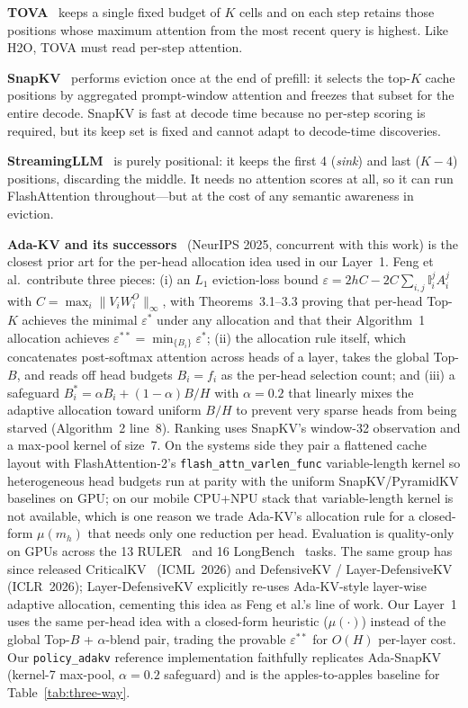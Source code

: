 \documentclass[sigconf, anonymous=false, screen=true]{acmart}
\begin{document}
\textbf{TOVA}~\cite{oren2024tova} keeps a single fixed budget of $K$ cells and on each step retains those positions whose maximum attention from the most recent query is highest. Like H2O, TOVA must read per-step attention.

\textbf{SnapKV}~\cite{li2024snapkv} performs eviction once at the end of prefill: it selects the top-$K$ cache positions by aggregated prompt-window attention and freezes that subset for the entire decode. SnapKV is fast at decode time because no per-step scoring is required, but its keep set is fixed and cannot adapt to decode-time discoveries.

\textbf{StreamingLLM}~\cite{xiao2024streamingllm} is purely positional: it keeps the first 4 (\emph{sink}) and last ($K-4$) positions, discarding the middle. It needs no attention scores at all, so it can run FlashAttention throughout---but at the cost of any semantic awareness in eviction.

\textbf{Ada-KV and its successors}~\cite{feng2025adakv} (NeurIPS 2025, concurrent with this work) is the closest prior art for the per-head allocation idea used in our Layer~1. Feng et al.\ contribute three pieces: (i) an $L_1$ eviction-loss bound $\varepsilon = 2hC - 2C\sum_{i,j}\mathbb{I}_i^j A_i^j$ with $C = \max_i \|V_i W_i^O\|_\infty$, with Theorems~3.1--3.3 proving that per-head Top-$K$ achieves the minimal $\varepsilon^\ast$ under any allocation and that their Algorithm~1 allocation achieves $\varepsilon^{\ast\ast} = \min_{\{B_i\}} \varepsilon^\ast$; (ii) the allocation rule itself, which concatenates post-softmax attention across heads of a layer, takes the global Top-$B$, and reads off head budgets $B_i = f_i$ as the per-head selection count; and (iii) a safeguard $B_i^\ast = \alpha B_i + (1-\alpha) B/H$ with $\alpha = 0.2$ that linearly mixes the adaptive allocation toward uniform $B/H$ to prevent very sparse heads from being starved (Algorithm~2 line~8). Ranking uses SnapKV's window-32 observation and a max-pool kernel of size~7. On the systems side they pair a flattened cache layout with FlashAttention-2's \texttt{flash\_attn\_varlen\_func} variable-length kernel so heterogeneous head budgets run at parity with the uniform SnapKV/PyramidKV baselines on GPU; on our mobile CPU+NPU stack that variable-length kernel is not available, which is one reason we trade Ada-KV's allocation rule for a closed-form $\mu(m_h)$ that needs only one reduction per head. Evaluation is quality-only on GPUs across the 13 RULER~\cite{hsieh2024ruler} and 16 LongBench~\cite{bai2023longbench} tasks. The same group has since released CriticalKV~\cite{feng2025criticalkv} (ICML~2026) and DefensiveKV / Layer-DefensiveKV~\cite{feng2025defensivekv} (ICLR~2026); Layer-DefensiveKV explicitly re-uses Ada-KV-style layer-wise adaptive allocation, cementing this idea as Feng et al.'s line of work. Our Layer~1 uses the same per-head idea with a closed-form heuristic ($\mu(\cdot)$) instead of the global Top-$B$ + $\alpha$-blend pair, trading the provable $\varepsilon^{\ast\ast}$ for $O(H)$ per-layer cost. Our \texttt{policy\_adakv} reference implementation faithfully replicates Ada-SnapKV (kernel-7 max-pool, $\alpha{=}0.2$ safeguard) and is the apples-to-apples baseline for Table~\ref{tab:three-way}.
\end{document}
